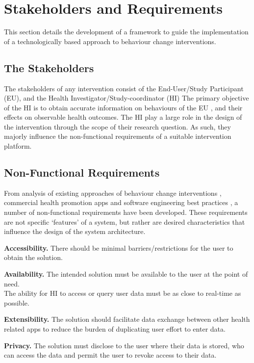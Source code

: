 \section{Stakeholders and Requirements}
This section details the development of a framework to guide the implementation of a technologically based approach to behaviour change interventions.

\subsection{The Stakeholders}
The stakeholders of any intervention consist of the End-User/Study Participant (EU), and the Health Investigator/Study-coordinator (HI)
The primary objective of the HI is to obtain accurate information on behaviours of the EU	, and their effects on observable health outcomes. The HI play a large role in the design of the intervention through the scope of their research question. As such, they majorly influence the non-functional requirements of a suitable intervention platform.

\subsection{Non-Functional Requirements}
From analysis of existing approaches of behaviour change interventions \cite{Prochaska2005,Ruiter2014}, commercial health promotion apps \cite{Ozdalga2012, Higgins2016} and software engineering best practices \cite{Fielding2000, Jones2010}, a number of non-functional requirements have been developed. These requirements are not specific `features' of a system, but rather are desired characteristics that influence the design of the system architecture.

\textbf{Accessibility.}
There should be minimal barriers/restrictions for the user to obtain the solution.

\textbf{Availability.}
The intended solution must be available to the user at the point of need.
\\The ability for HI to access or query user data must be as close to real-time as possible.

\textbf{Extensibility.}
The solution should facilitate data exchange between other health related apps to reduce the burden of duplicating user effort to enter data.

\textbf{Privacy.}
The solution must disclose to the user where their data is stored, who can access the data and permit the user to revoke access to their data.

